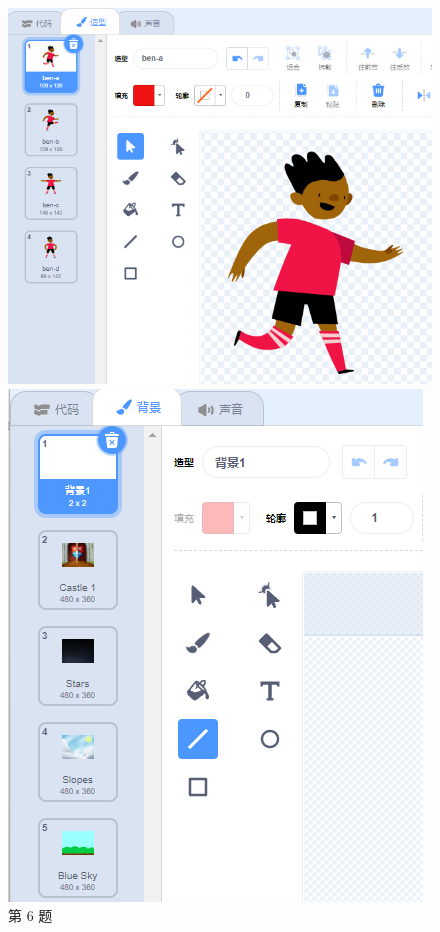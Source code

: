 \documentclass[10pt, a4paper]{article}
\begin{document}
\begin{enumerate}
         \begin{figure}[htbp]
            \centering
            \begin{minipage}[t]{.25\textwidth}
                \centering
                \includegraphics[width=\textwidth]{6.png}
                \caption*{第 6 题}
            \end{minipage}
            \begin{minipage}[t]{.18\textwidth}
                \centering
                \includegraphics[width=\textwidth]{8.png}

\end{minipage}
\end{figure}
\end{enumerate}
\end{document}
